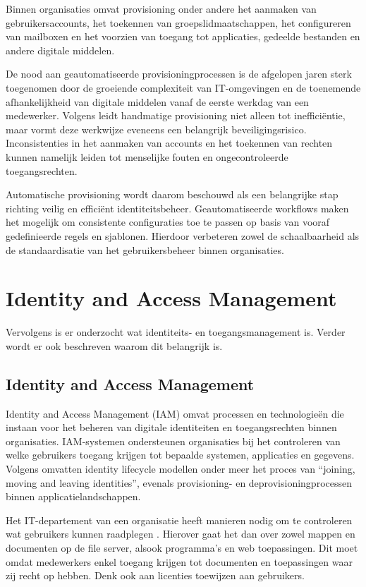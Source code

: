 Binnen organisaties omvat provisioning onder andere het aanmaken van gebruikersaccounts, het toekennen van groepslidmaatschappen, het configureren van mailboxen en het voorzien van toegang tot applicaties, gedeelde bestanden en andere digitale middelen.

De nood aan geautomatiseerde provisioningprocessen is de afgelopen jaren sterk toegenomen door de groeiende complexiteit van IT-omgevingen en de toe\-ne\-mende afhankelijkheid van digitale middelen vanaf de eerste werkdag van een medewerker. Volgens \textcite{Okta2025} leidt handmatige provisioning niet alleen tot inefficiëntie, maar vormt deze werkwijze eveneens een belangrijk beveiligingsrisico. Inconsistenties in het aanmaken van accounts en het toekennen van rechten kunnen namelijk leiden tot menselijke fouten en ongecontroleerde toegangsrechten.

Automatische provisioning wordt daarom beschouwd als een belangrijke stap richting veilig en efficiënt identiteitsbeheer. Geautomatiseerde workflows maken het mogelijk om consistente configuraties toe te passen op basis van vooraf gedefinieerde regels en sjablonen. Hierdoor verbeteren zowel de schaalbaarheid als de standaardisatie van het gebruikersbeheer binnen organisaties.

\section{Identity and Access Management}

Vervolgens is er onderzocht wat identiteits- en toegangsmanagement is. Verder wordt er ook beschreven waarom dit belangrijk is.

\subsection{Identity and Access Management}

Identity and Access Management (IAM) omvat processen en technologieën die instaan voor het beheren van digitale identiteiten en toegangsrechten binnen organisaties. IAM-systemen ondersteunen organisaties bij het controleren van welke gebruikers toegang krijgen tot bepaalde systemen, applicaties en gegevens. Volgens \textcite{Baumer2026} omvatten identity lifecycle modellen onder meer het proces van “joining, moving and leaving identities”, evenals provisioning- en deprovisioningprocessen binnen applicatielandschappen.

Het IT-departement van een organisatie heeft manieren nodig om te controleren wat gebruikers kunnen raadplegen \autocite{Microsoft2026}. Hierover gaat het dan over zowel mappen en documenten op de file server, alsook programma's en web toepassingen. Dit moet omdat medewerkers enkel toegang krijgen tot documenten en toepassingen waar zij recht op hebben. Denk ook aan licenties toewijzen aan gebruikers. 

